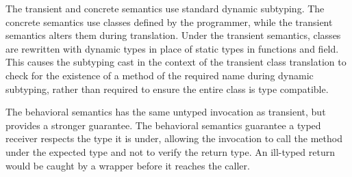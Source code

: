 \documentclass[runnningheads]{tex/llncs}
\begin{document}
The transient and concrete semantics use standard dynamic subtyping.
The concrete semantics use classes defined by the programmer, while the
transient semantics alters them during translation. Under the transient
semantics, classes are rewritten with dynamic types in place of static types
in functions and field. This causes the subtyping cast in the context of the
transient class translation to check for the existence of a method of
the required name during dynamic subtyping, rather than required to ensure 
the entire class is type compatible.

The behavioral semantics has the same untyped invocation as transient, but 
provides a stronger guarantee. 
The behavioral semantics guarantee a typed receiver respects the type
it is under, allowing the invocation to call the method under the
expected type and not to verify the return type. An ill-typed return
would be caught by a wrapper before it reaches the caller.

\end{document}
